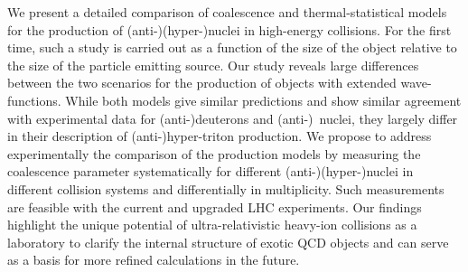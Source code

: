 
We present a detailed comparison of coalescence and thermal-statistical models for the production of (anti-)(hyper-)nuclei in high-energy collisions. For the first time, such a study is carried out as a function of the size of the object relative to the size of the particle emitting source. Our study reveals large differences between the two scenarios for the production of objects with extended wave-functions. While both models give similar predictions and show similar agreement with experimental data for (anti-)deuterons and (anti-)\hethree\ nuclei,  they largely differ in their description of (anti-)hyper-triton production.
We propose to address experimentally the comparison of the production models by measuring the coalescence parameter systematically for different (anti-)(hyper-)nuclei in different collision systems and differentially in multiplicity. 
Such measurements are feasible with the current and upgraded LHC experiments. 
Our findings highlight the unique potential of ultra-relativistic heavy-ion collisions as a laboratory to clarify the internal structure of exotic QCD objects and can serve as a basis for more refined calculations in the future.
